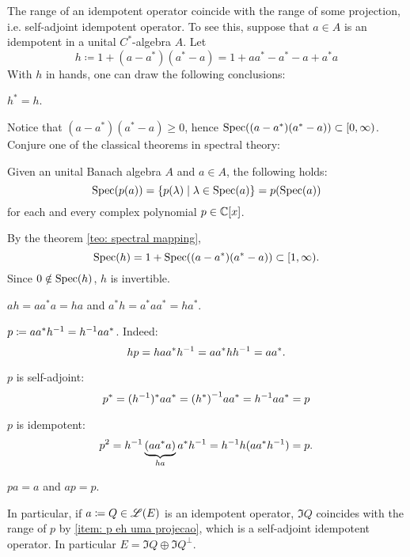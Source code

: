 \begin{observacao}\label{obs: idempotente gerando inversivel}
    The range of an idempotent operator coincide with the range of some projection, i.e. self-adjoint idempotent operator. To see this, suppose that $a\in A$ is an idempotent in a unital $C^*$-algebra $A$.  Let
    \[
    h \coloneqq 1 + (a-a^*)(a^*-a) = 1 + aa^* - a^* - a + a^*a
    \]
    With $h$ in hands, one can draw the following conclusions: 
    
    \begin{itroman}
        \item $h^* = h$.
        \item Notice that $(a-a^*)(a^*-a) \geqslant 0$, hence $\operatorname{Spec}((a-a^*)(a^*-a)) \subset [0,\infty)$. Conjure one of the classical theorems in spectral theory:        
        \begin{invocacao}
            \label{teo: spectral mapping}
            Given an unital Banach algebra $A$ and $a\in A$, the following holds:
            \begin{equation*}
                \operatorname{Spec}(p(a)) = \{p(\lambda) \mid \lambda \in \operatorname{Spec}(a)\} = p(\operatorname{Spec}(a))
            \end{equation*}
            for each and every complex polynomial $p \in \operatorname{\mathbb{C}}[x]$.
        \end{invocacao}
        By the theorem \ref{teo: spectral mapping}, 
        \begin{equation*}
            \operatorname{Spec}(h) = 1 + \operatorname{Spec}((a-a^*)(a^*-a)) \subset [1,\infty).
        \end{equation*}
        Since $0 \notin \operatorname{Spec}(h)$, $h$ is invertible.
        \item $ah = aa^*a = ha$ and $a^*h =  a^*aa^* =ha^*$.
        \item $p \coloneqq aa^*h^{-1} = {h}^{-1}aa^*$. Indeed:
        \[
        hp = haa^*{h}^{-1} = aa^*h{h}^{-1} = aa^*.
        \]
        \item $p$ is self-adjoint:
        \[
        p^* = ({h}^{-1})^*aa^* = {(h^*)}^{-1}aa^* = {h}^{-1}aa^* = p
        \]
        \item $p$ is idempotent:
        \[
        p^2 = {h}^{-1}\underbrace{(aa^*a)}_{ha}a^*{h}^{-1} = {h}^{-1}h(aa^* {h}^{-1}) = p.
        \]
        
        \item \label{item: p eh uma projecao} $pa = a$ and $ap= p$. 
    \end{itroman}
    
    In particular, if $a\coloneqq Q\in \mathscr L(E)$ is an idempotent operator, $\Im Q$ coincides with the range of $p$ by \ref{item: p eh uma projecao}, which is a self-adjoint idempotent operator. In particular $E = \Im Q \oplus \Im Q^{\perp}$.
\end{observacao}


